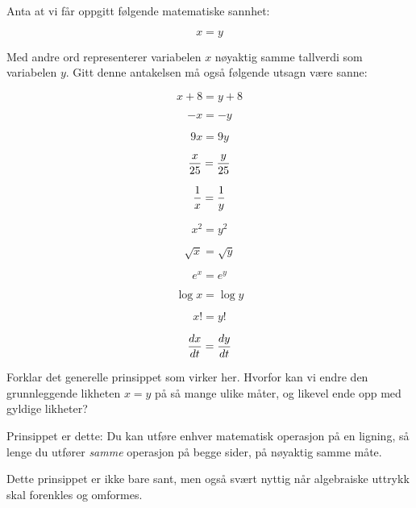 

Anta at vi får oppgitt følgende matematiske sannhet:

$$x = y$$

Med andre ord representerer variabelen $x$ nøyaktig samme tallverdi som variabelen $y$. Gitt denne antakelsen må også følgende utsagn være sanne:

$$x + 8 = y + 8$$

$$-x = -y$$

$$9x = 9y$$

$${x \over 25} = {y \over 25}$$

$${1 \over x} = {1 \over y}$$

$$x^2 = y^2$$

$$\sqrt{x} = \sqrt{y}$$

$$e^x = e^y$$

$$\log x = \log y$$

$$x! = y!$$

$${dx \over dt} = {dy \over dt}$$

Forklar det generelle prinsippet som virker her. Hvorfor kan vi endre den grunnleggende likheten $x = y$ på så mange ulike måter, og likevel ende opp med gyldige likheter?







Prinsippet er dette: Du kan utføre enhver matematisk operasjon på en ligning, så lenge du utfører {\it samme} operasjon på begge sider, på nøyaktig samme måte.







Dette prinsippet er ikke bare sant, men også svært nyttig når algebraiske uttrykk skal forenkles og omformes.


